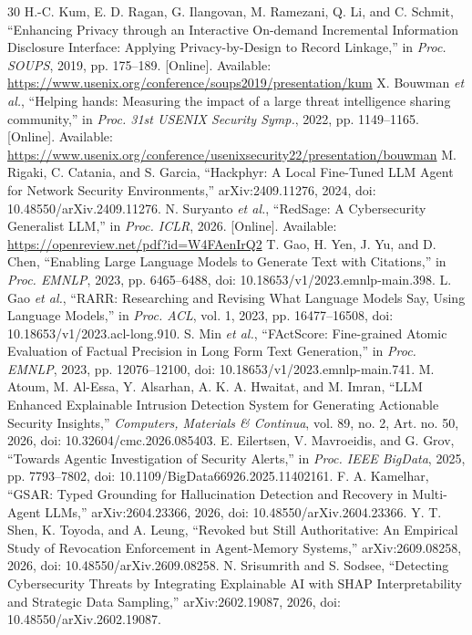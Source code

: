 \documentclass[conference,letterpaper]{IEEEtran}
\begin{document}
\begin{thebibliography}{30}
 H.-C. Kum, E. D. Ragan, G. Ilangovan, M. Ramezani, Q. Li, and C. Schmit, ``Enhancing Privacy through an Interactive On-demand Incremental Information Disclosure Interface: Applying Privacy-by-Design to Record Linkage,'' in \emph{Proc. SOUPS}, 2019, pp. 175--189. [Online]. Available: \url{https://www.usenix.org/conference/soups2019/presentation/kum}
 X. Bouwman \emph{et al.}, ``Helping hands: Measuring the impact of a large threat intelligence sharing community,'' in \emph{Proc. 31st USENIX Security Symp.}, 2022, pp. 1149--1165. [Online]. Available: \url{https://www.usenix.org/conference/usenixsecurity22/presentation/bouwman}
 M. Rigaki, C. Catania, and S. Garcia, ``Hackphyr: A Local Fine-Tuned LLM Agent for Network Security Environments,'' arXiv:2409.11276, 2024, doi: 10.48550/arXiv.2409.11276.
 N. Suryanto \emph{et al.}, ``RedSage: A Cybersecurity Generalist LLM,'' in \emph{Proc. ICLR}, 2026. [Online]. Available: \url{https://openreview.net/pdf?id=W4FAenIrQ2}
 T. Gao, H. Yen, J. Yu, and D. Chen, ``Enabling Large Language Models to Generate Text with Citations,'' in \emph{Proc. EMNLP}, 2023, pp. 6465--6488, doi: 10.18653/v1/2023.emnlp-main.398.
 L. Gao \emph{et al.}, ``RARR: Researching and Revising What Language Models Say, Using Language Models,'' in \emph{Proc. ACL}, vol. 1, 2023, pp. 16477--16508, doi: 10.18653/v1/2023.acl-long.910.
 S. Min \emph{et al.}, ``FActScore: Fine-grained Atomic Evaluation of Factual Precision in Long Form Text Generation,'' in \emph{Proc. EMNLP}, 2023, pp. 12076--12100, doi: 10.18653/v1/2023.emnlp-main.741.
 M. Atoum, M. Al-Essa, Y. Alsarhan, A. K. A. Hwaitat, and M. Imran, ``LLM Enhanced Explainable Intrusion Detection System for Generating Actionable Security Insights,'' \emph{Computers, Materials \& Continua}, vol. 89, no. 2, Art. no. 50, 2026, doi: 10.32604/cmc.2026.085403.
 E. Eilertsen, V. Mavroeidis, and G. Grov, ``Towards Agentic Investigation of Security Alerts,'' in \emph{Proc. IEEE BigData}, 2025, pp. 7793--7802, doi: 10.1109/BigData66926.2025.11402161.
 F. A. Kamelhar, ``GSAR: Typed Grounding for Hallucination Detection and Recovery in Multi-Agent LLMs,'' arXiv:2604.23366, 2026, doi: 10.48550/arXiv.2604.23366.
 Y. T. Shen, K. Toyoda, and A. Leung, ``Revoked but Still Authoritative: An Empirical Study of Revocation Enforcement in Agent-Memory Systems,'' arXiv:2609.08258, 2026, doi: 10.48550/arXiv.2609.08258.
 N. Srisumrith and S. Sodsee, ``Detecting Cybersecurity Threats by Integrating Explainable AI with SHAP Interpretability and Strategic Data Sampling,'' arXiv:2602.19087, 2026, doi: 10.48550/arXiv.2602.19087.

\end{thebibliography}
\end{document}
